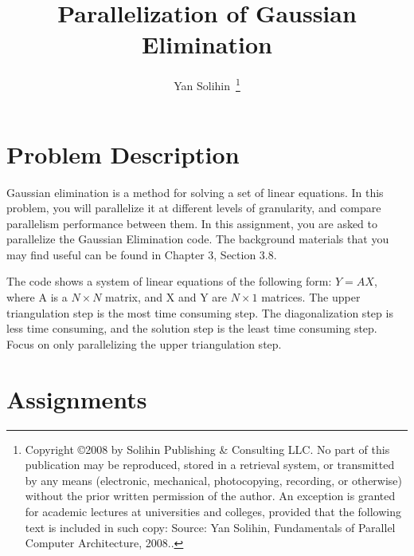 





\title{Parallelization of Gaussian Elimination}
\author{Yan Solihin~\thanks{Copyright \copyright 2008 by Solihin Publishing \& Consulting LLC. No part of this publication may be reproduced, stored in a retrieval system, or transmitted by any means (electronic, mechanical, photocopying, recording, or otherwise) without the prior written permission of the author. An exception is granted for academic lectures at universities and colleges, provided that the following text is included in such copy: Source: Yan Solihin, Fundamentals of Parallel Computer Architecture, 2008..}}
\date{}
\maketitle


\section{Problem Description}

Gaussian elimination is a method for solving a set of linear
equations. In this problem, you will parallelize it at different 
levels of granularity, and compare parallelism performance between them. In this assignment, 
you are asked to parallelize the Gaussian Elimination code. The background
materials that you may find useful can be found in Chapter 3, Section 3.8. 

The code shows a system of linear equations of the following form: 
$Y = AX$, where A is a $N\times N$ matrix, and X and Y are $N \times 1$ matrices. 
The upper triangulation step is the most time consuming step. The diagonalization
step is less time consuming, and the solution step is the least time consuming step. 
Focus on only parallelizing the upper triangulation step. 

\section{Assignments}

